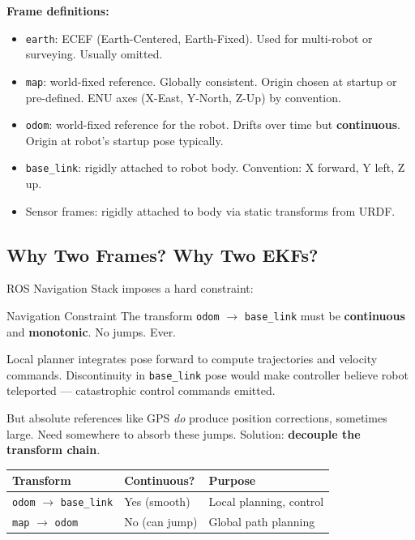 \documentclass[11pt,a4paper]{article}
\begin{document}
\textbf{Frame definitions:}
\begin{itemize}
\item \texttt{earth}: ECEF (Earth-Centered, Earth-Fixed). Used for multi-robot or surveying. Usually omitted.
\item \texttt{map}: world-fixed reference. Globally consistent. Origin chosen at startup or pre-defined. ENU axes (X-East, Y-North, Z-Up) by convention.
\item \texttt{odom}: world-fixed reference for the robot. Drifts over time but \textbf{continuous}. Origin at robot's startup pose typically.
\item \texttt{base\_link}: rigidly attached to robot body. Convention: X forward, Y left, Z up.
\item Sensor frames: rigidly attached to body via static transforms from URDF.
\end{itemize}

\subsection{Why Two Frames? Why Two EKFs?}

ROS Navigation Stack imposes a hard constraint:

\begin{warnbox}{Navigation Constraint}
The transform \texttt{odom} $\to$ \texttt{base\_link} must be \textbf{continuous} and \textbf{monotonic}. No jumps. Ever.
\end{warnbox}

Local planner integrates pose forward to compute trajectories and velocity commands. Discontinuity in \texttt{base\_link} pose would make controller believe robot teleported --- catastrophic control commands emitted.

But absolute references like GPS \emph{do} produce position corrections, sometimes large. Need somewhere to absorb these jumps. Solution: \textbf{decouple the transform chain}.

\begin{center}
\begin{tabular}{lll}
\toprule
\textbf{Transform} & \textbf{Continuous?} & \textbf{Purpose}\\
\midrule
\texttt{odom} $\to$ \texttt{base\_link} & Yes (smooth) & Local planning, control \\
\texttt{map} $\to$ \texttt{odom} & No (can jump) & Global path planning \\
\bottomrule
\end{tabular}
\end{center}
\end{document}
